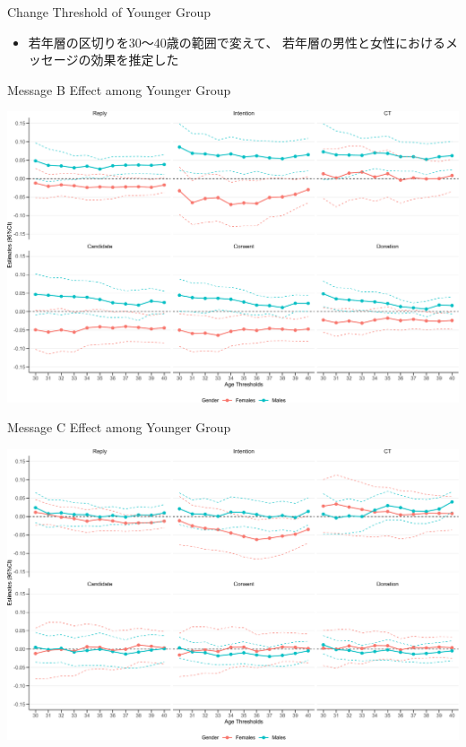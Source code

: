 \documentclass[
      aspectratio=169,
        12pt,
    ]{beamer}
\providecommand{\tightlist}{%
  \setlength{\itemsep}{0pt}\setlength{\parskip}{0pt}}
\begin{document}
\begin{frame}{Change Threshold of Younger Group}
\protect\hypertarget{change-threshold-of-younger-group}{}
\begin{itemize}
\tightlist
\item
  若年層の区切りを30～40歳の範囲で変えて、
  若年層の男性と女性におけるメッセージの効果を推定した
\end{itemize}
\end{frame}

\begin{frame}{Message B Effect among Younger Group}
\protect\hypertarget{message-b-effect-among-younger-group}{}
\begin{center}\includegraphics[width=0.75\linewidth]{report_files/figure-beamer/plotB-change-age-threshold-1} \end{center}
\end{frame}

\begin{frame}{Message C Effect among Younger Group}
\protect\hypertarget{message-c-effect-among-younger-group}{}
\begin{center}\includegraphics[width=0.75\linewidth]{report_files/figure-beamer/plotC-change-age-threshold-1} \end{center}
\end{frame}
\end{document}
